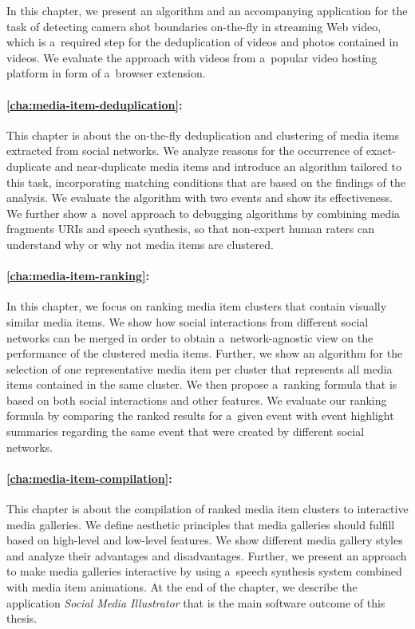 In this chapter, we present an algorithm and an 
accompanying application for the task of detecting
camera shot boundaries on-the-fly in streaming Web video,
which is a~required step for the deduplication of videos
and photos contained in videos.
We evaluate the approach with videos from a~popular video hosting platform in form of a~browser extension.

\paragraph{\autoref{cha:media-item-deduplication}:}

This chapter is about the on-the-fly deduplication and clustering
of media items extracted from social networks.
We analyze reasons for the occurrence of exact-duplicate
and near-duplicate media items and introduce an algorithm
tailored to this task, incorporating matching conditions
that are based on the findings of the analysis.
We evaluate the algorithm with two events
and show its effectiveness.
We further show a~novel approach to debugging algorithms
by combining media fragments URIs and speech synthesis,
so that non-expert human raters can understand why or why not
media items are clustered.

\paragraph{\autoref{cha:media-item-ranking}:}

In this chapter, we focus on ranking media item clusters
that contain visually similar media items.
We show how social interactions from different social networks
can be merged in order to obtain a~network-agnostic view
on the performance of the clustered media items.
Further, we show an algorithm for the selection of
one representative media item per cluster that represents
all media items contained in the same cluster.
We then propose a~ranking formula that is based on both
social interactions and other features.
We evaluate our ranking formula by comparing the ranked results
for a~given event with event highlight summaries regarding the same event
that were created by different social networks.

\paragraph{\autoref{cha:media-item-compilation}:}

This chapter is about the compilation of ranked media item clusters
to interactive media galleries.
We define aesthetic principles that media galleries should fulfill
based on high-level and low-level features.
We show different media gallery styles and analyze their 
advantages and disadvantages.
Further, we present an approach to make media galleries interactive
by using a~speech synthesis system combined with media item animations.
At the end of the chapter, we describe the application
\emph{Social Media Illustrator} that is
the main software outcome of this thesis.

